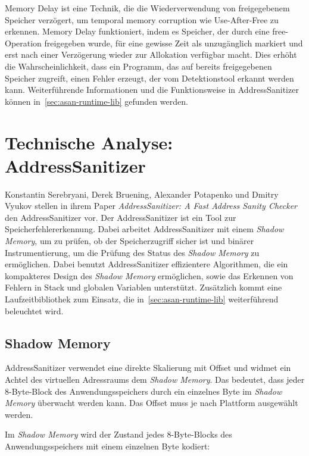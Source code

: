 \documentclass[acmtog,nonacm]{acmart}
\begin{document}
Memory Delay ist eine Technik, die die Wiederverwendung von freigegebenem
Speicher verzögert, um temporal memory corruption wie Use-After-Free zu
erkennen. Memory Delay funktioniert, indem es Speicher, der durch eine
free-Operation freigegeben wurde, für eine gewisse Zeit als unzugänglich
markiert und erst nach einer Verzögerung wieder zur Allokation verfügbar macht.
Dies erhöht die Wahrscheinlichkeit, dass ein Programm, das auf bereits
freigegebenen Speicher zugreift, einen Fehler erzeugt, der vom Detektionstool
erkannt werden kann. Weiterführende Informationen und die Funktionsweise in
AddressSanitizer können in~\cref{sec:asan-runtime-lib} gefunden werden.

\section{Technische Analyse: AddressSanitizer}

Konstantin Serebryani, Derek Bruening, Alexander Potapenko und Dmitry Vyukov
stellen in ihrem Paper \textit{AddressSanitizer: A Fast Address Sanity Checker}
\cite{serebryany_addresssanitizer_2012} den AddressSanitizer vor. Der
AddressSanitizer ist ein Tool zur Speicherfehlererkennung. Dabei
arbeitet AddressSanitizer mit einem \textit{Shadow Memory}, um zu
prüfen, ob der Speicherzugriff sicher ist und binärer Instrumentierung, um die
Prüfung des Status des \textit{Shadow Memory} zu ermöglichen. Dabei benutzt
AddressSanitizer effizientere Algorithmen, die ein kompakteres Design des
\textit{Shadow Memory} ermöglichen, sowie das Erkennen von Fehlern in Stack und
globalen Variablen unterstützt. Zusätzlich kommt eine Laufzeitbibliothek zum
Einsatz, die in~\cref{sec:asan-runtime-lib} weiterführend beleuchtet wird.

\subsection{Shadow Memory}\label{sec:asan-shadow-memory}

AddressSanitizer verwendet eine direkte Skalierung mit Offset und widmet ein
Achtel des virtuellen Adressraums dem \textit{Shadow Memory}. Das bedeutet,
dass jeder 8-Byte-Block des Anwendungsspeichers durch ein einzelnes Byte im
\textit{Shadow Memory} überwacht werden kann. Das Offset muss je nach Plattform
ausgewählt werden.

Im \textit{Shadow Memory} wird der Zustand jedes 8-Byte-Blocks des
Anwendungsspeichers mit einem einzelnen Byte kodiert:
\end{document}
